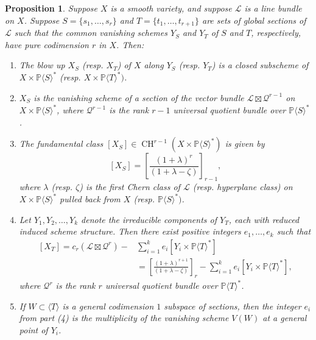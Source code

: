 \documentclass[reqno, 11pt]{amsart}
\theoremstyle{plain}
\newtheorem{proposition}[theorem]{Proposition}
\theoremstyle{remark}
\renewcommand{\P}{\mathbb{P}}
\renewcommand{\L}{\mathscr{L}}
\DeclareMathOperator{\CH}{CH}
\begin{document}
    \begin{proposition}
        \label{proposition:resolution}
        Suppose $X$ is a smooth variety, and suppose $\L$ is a line bundle on $X$. Suppose $S = \{s_1, \dots, s_r\}$ and $T = \{t_1, \dots, t_{r+1}\}$ are sets of global sections of $\L$ such that the common vanishing schemes $Y_S$ and $Y_T$ of $S$ and $T$, respectively, have pure codimension $r$ in $X$.
        Then: 
        \begin{enumerate}
            \item The blow up $X_{S}$ (resp. $X_{T}$) of $X$ along $Y_S$ (resp. $Y_T$) is a closed subscheme of $X \times \P \langle S \rangle^{*}$ (resp. $X \times \P \langle T \rangle^{*})$.
            \item $X_{S}$ is the vanishing scheme of a section of the vector bundle $\L \boxtimes \mathscr{Q}^{r-1}$ on $X \times \P \langle S \rangle^{*}$, where $\mathscr{Q}^{r-1}$ is the rank $r-1$ universal quotient bundle over $\P \langle S \rangle^{*}$.
            \item The fundamental class $[X_{S}] \in \CH^{r-1}(X \times \P \langle S \rangle^{*})$ is given by 
            \begin{equation}
                \label{equation:classS}
                [X_{S}] = \left[\frac{(1+\lambda)^{r}}{(1 + \lambda - \zeta)}\right]_{r-1},
            \end{equation}
            where $\lambda$ (resp. $\zeta$) is the first Chern class of $\L$ (resp. hyperplane class) on  $X \times \P \langle S \rangle^{*}$ pulled back  from $X$ (resp. $\P \langle S \rangle^{*})$.
            \item Let $Y_1, Y_2, \dots, Y_{k}$ denote the irreducible components of $Y_T$, each with reduced induced scheme structure.  Then there exist positive integers $e_1, \dots, e_k$ such that 
            \begin{align}
                \label{equation:classT}
                \nonumber [X_{T}] = c_{r}(\L \boxtimes \mathscr{Q}^{r}) - &\sum_{i=1}^{k} e_i [Y_i \times \P \langle T \rangle^{*}]\\ 
                 & = \left[\frac{(1+\lambda)^{r+1}}{(1 + \lambda - \zeta)}\right]_{r} - \sum_{i=1}^{k} e_i [Y_{i} \times \P \langle T \rangle^{*}],
            \end{align}
            where $\mathscr{Q}^{r}$ is the rank $r$ universal quotient bundle over $\P \langle T \rangle^{*}$.
            \item If $W \subset \langle T \rangle$ is a general codimension $1$ subspace of sections, then the integer $e_i$ from part (4) is the multiplicity of the vanishing scheme $V(W)$ at a general point of $Y_i$. 
        \end{enumerate}
    \end{proposition}
    
\end{document}
